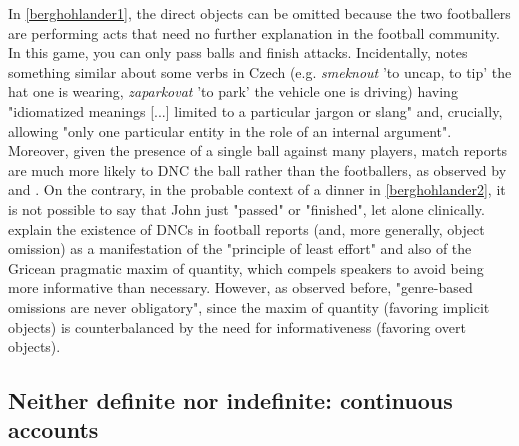 In \ref{berghohlander1}, the direct objects can be omitted because the two footballers are performing acts that need no further explanation in the football community. In this game, you can only pass balls and finish attacks. Incidentally, \textcite[266]{Dvorak2017thesis} notes something similar about some verbs in Czech (e.g. \textit{smeknout} 'to uncap, to tip' the hat one is wearing, \textit{zaparkovat} 'to park' the vehicle one is driving) having "idiomatized meanings [...] limited to a particular jargon or slang" and, crucially, allowing "only one particular entity in the role of an internal argument".\\
Moreover, given the presence of a single ball against many players, match reports are much more likely to DNC the ball rather than the footballers, as observed by \textcite[167]{RuppenhoferMichaelis2010} and \textcite{ebeling2021score}. On the contrary, in the probable context of a dinner in \ref{berghohlander2}, it is not possible to say that John just "passed" or "finished", let alone clinically. \textcite[22]{BerghOhlander2016} explain the existence of DNCs in football reports (and, more generally, object omission) as a manifestation of the "principle of least effort" \parencite{zipf1949leasteffort} and also of the Gricean pragmatic maxim of quantity, which compels speakers to avoid being more informative than necessary. However, as \textcite[166]{RuppenhoferMichaelis2010} observed before, "genre-based omissions are never obligatory", since the maxim of quantity (favoring implicit objects) is counterbalanced by the need for informativeness (favoring overt objects).


\subsection{Neither definite nor indefinite: continuous accounts} 

